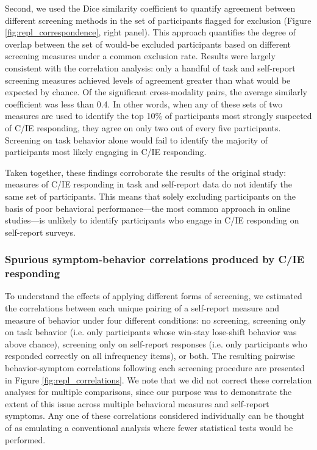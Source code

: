 \documentclass[a4paper,notitlepage,12pt]{article}
\begin{document}
\begin{refsection}[supp]
Second, we used the Dice similarity coefficient to quantify agreement between different screening methods in the set of participants flagged for exclusion (Figure \ref{fig:repl_correspondence}, right panel). This approach quantifies the degree of overlap between the set of would-be excluded participants based on different screening measures under a common exclusion rate. Results were largely consistent with the correlation analysis: only a handful of task and self-report screening measures achieved levels of agreement greater than what would be expected by chance. Of the significant cross-modality pairs, the average similarly coefficient was less than 0.4. In other words, when any of these sets of two measures are used to identify the top 10\% of participants most strongly suspected of C/IE responding, they agree on only two out of every five participants. Screening on task behavior alone would fail to identify the majority of participants most likely engaging in C/IE responding.

Taken together, these findings corroborate the results of the original study: measures of C/IE responding in task and self-report data do not identify the same set of participants. This means that solely excluding participants on the basis of poor behavioral performance---the most common approach in online studies---is unlikely to identify participants who engage in C/IE responding on self-report surveys. 

\subsubsection*{Spurious symptom-behavior correlations produced by C/IE responding}

To understand the effects of applying different forms of screening, we estimated the correlations between each unique pairing of a self-report measure and measure of behavior under four different conditions: no screening, screening only on task behavior (i.e. only participants whose win-stay lose-shift behavior was above chance), screening only on self-report responses (i.e. only participants who responded correctly on all infrequency items), or both. The resulting pairwise behavior-symptom correlations following each screening procedure are presented in Figure \ref{fig:repl_correlations}. We note that we did not correct these correlation analyses for multiple comparisons, since our purpose was to demonstrate the extent of this issue across multiple behavioral measures and self-report symptoms. Any one of these correlations considered individually can be thought of as emulating a conventional analysis where fewer statistical tests would be performed.


\end{refsection}
\end{document}
